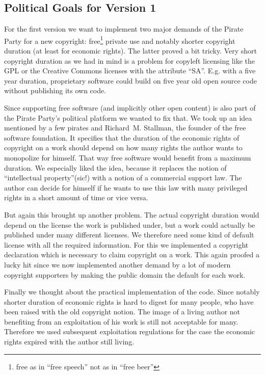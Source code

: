 \subsection{Political Goals for Version 1}

For the first version we want to implement two major demands of the Pirate Party for a new copyright: free\footnote{free as in ``free speech'' not as in ``free beer''} private use and notably shorter copyright duration (at least for economic rights). The latter proved a bit tricky. Very short copyright duration as we had in mind is a problem for copyleft licensing like the GPL or the Creative Commons licenses with the attribute ``SA''. E.g. with a five year duration, proprietary software could build on five year old open source code without publishing its own code. 

Since supporting free software (and implicitly other open content) is also part of the Pirate Party's political platform we wanted to fix that. We took up an idea mentioned by a few pirates and Richard~M. Stallman, the founder of the free software foundation. It specifies that the duration of the economic rights of copyright on a work should depend on how many rights the author wants to monopolize for himself. That way free software would benefit from a maximum duration. We especially liked the idea, because it replaces the notion of ``intellectual property''(sic!) with a notion of a commercial support law. The author can decide for himself if he wants to use this law with many privileged rights in a short amount of time or vice versa. 

But again this brought up another problem. The actual copyright duration would depend on the license the work is published under, but a work could actually be published under many different licenses. We therefore need some kind of default license with all the required information. For this we implemented a copyright declaration which is necessary to claim copyright on a work. This again proofed a lucky hit since we now implemented another demand by a lot of modern copyright supporters by making the public domain the default for each work.

Finally we thought about the practical implementation of the code. Since notably shorter duration of economic rights is hard to digest for many people, who have been raised with the old copyright notion. The image of a living author not benefiting from an exploitation of his work is still not acceptable for many. Therefore we used subsequent exploitation regulations for the case the economic rights expired with the author still living.

